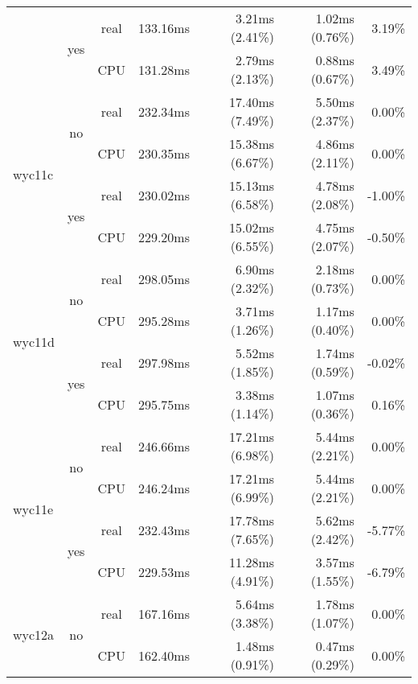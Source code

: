 \documentclass[en]{pracamgr}
\begin{document}
\begin{small}
\begin{longtable}{|l|c|c|r|r|r|r|}
                          \cline{2-7}
                          & \multirow{2}{*}{yes} & real & 133.16ms & 3.21ms (2.41\%) & 1.02ms (0.76\%) & 3.19\% \\*
                          &                      & CPU  & 131.28ms & 2.79ms (2.13\%) & 0.88ms (0.67\%) & 3.49\% \\
\hline
\multirow{4}{*}{wyc11c}   & \multirow{2}{*}{no}  & real & 232.34ms & 17.40ms (7.49\%) & 5.50ms (2.37\%) & 0.00\% \\*
                          &                      & CPU  & 230.35ms & 15.38ms (6.67\%) & 4.86ms (2.11\%) & 0.00\% \\*
                          \cline{2-7}
                          & \multirow{2}{*}{yes} & real & 230.02ms & 15.13ms (6.58\%) & 4.78ms (2.08\%) & -1.00\% \\*
                          &                      & CPU  & 229.20ms & 15.02ms (6.55\%) & 4.75ms (2.07\%) & -0.50\% \\
\hline
\multirow{4}{*}{wyc11d}   & \multirow{2}{*}{no}  & real & 298.05ms & 6.90ms (2.32\%) & 2.18ms (0.73\%) & 0.00\% \\*
                          &                      & CPU  & 295.28ms & 3.71ms (1.26\%) & 1.17ms (0.40\%) & 0.00\% \\*
                          \cline{2-7}
                          & \multirow{2}{*}{yes} & real & 297.98ms & 5.52ms (1.85\%) & 1.74ms (0.59\%) & -0.02\% \\*
                          &                      & CPU  & 295.75ms & 3.38ms (1.14\%) & 1.07ms (0.36\%) & 0.16\% \\
\hline
\multirow{4}{*}{wyc11e}   & \multirow{2}{*}{no}  & real & 246.66ms & 17.21ms (6.98\%) & 5.44ms (2.21\%) & 0.00\% \\*
                          &                      & CPU  & 246.24ms & 17.21ms (6.99\%) & 5.44ms (2.21\%) & 0.00\% \\*
                          \cline{2-7}
                          & \multirow{2}{*}{yes} & real & 232.43ms & 17.78ms (7.65\%) & 5.62ms (2.42\%) & -5.77\% \\*
                          &                      & CPU  & 229.53ms & 11.28ms (4.91\%) & 3.57ms (1.55\%) & -6.79\% \\
\hline
\multirow{4}{*}{wyc12a}   & \multirow{2}{*}{no}  & real & 167.16ms & 5.64ms (3.38\%) & 1.78ms (1.07\%) & 0.00\% \\*
                          &                      & CPU  & 162.40ms & 1.48ms (0.91\%) & 0.47ms (0.29\%) & 0.00\% \\*

\end{longtable}
\end{small}
\end{document}

